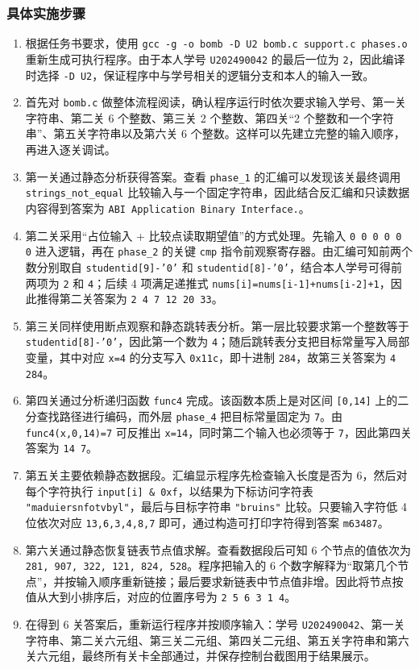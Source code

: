 \documentclass[supercite]{Experimental_Report}
\theoremstyle{definition}
\begin{document}
\subsubsection{具体实施步骤}
\begin{enumerate}
  \item 根据任务书要求，使用 \texttt{gcc -g -o bomb -D U2 bomb.c support.c phases.o} 重新生成可执行程序。由于本人学号 \texttt{U202490042} 的最后一位为 \texttt{2}，因此编译时选择 \texttt{-D U2}，保证程序中与学号相关的逻辑分支和本人的输入一致。
  \item 首先对 \texttt{bomb.c} 做整体流程阅读，确认程序运行时依次要求输入学号、第一关字符串、第二关 6 个整数、第三关 2 个整数、第四关“2 个整数和一个字符串”、第五关字符串以及第六关 6 个整数。这样可以先建立完整的输入顺序，再进入逐关调试。
  \item 第一关通过静态分析获得答案。查看 \texttt{phase\_1} 的汇编可以发现该关最终调用 \texttt{strings\_not\_equal} 比较输入与一个固定字符串，因此结合反汇编和只读数据内容得到答案为 \texttt{ABI Application Binary Interface.}。
  \item 第二关采用“占位输入 + 比较点读取期望值”的方式处理。先输入 \texttt{0 0 0 0 0 0} 进入逻辑，再在 \texttt{phase\_2} 的关键 \texttt{cmp} 指令前观察寄存器。由汇编可知前两个数分别取自 \texttt{studentid[9]-'0'} 和 \texttt{studentid[8]-'0'}，结合本人学号可得前两项为 \texttt{2} 和 \texttt{4}；后续 4 项满足递推式 \texttt{nums[i]=nums[i-1]+nums[i-2]+1}，因此推得第二关答案为 \texttt{2 4 7 12 20 33}。
  \item 第三关同样使用断点观察和静态跳转表分析。第一层比较要求第一个整数等于 \texttt{studentid[8]-'0'}，因此第一个数为 \texttt{4}；随后跳转表分支把目标常量写入局部变量，其中对应 \texttt{x=4} 的分支写入 \texttt{0x11c}，即十进制 \texttt{284}，故第三关答案为 \texttt{4 284}。
  \item 第四关通过分析递归函数 \texttt{func4} 完成。该函数本质上是对区间 \texttt{[0,14]} 上的二分查找路径进行编码，而外层 \texttt{phase\_4} 把目标常量固定为 \texttt{7}。由 \texttt{func4(x,0,14)=7} 可反推出 \texttt{x=14}，同时第二个输入也必须等于 \texttt{7}，因此第四关答案为 \texttt{14 7}。
  \item 第五关主要依赖静态数据段。汇编显示程序先检查输入长度是否为 6，然后对每个字符执行 \texttt{input[i] \& 0xf}，以结果为下标访问字符表 \texttt{"maduiersnfotvbyl"}，最后与目标字符串 \texttt{"bruins"} 比较。只要输入字符低 4 位依次对应 \texttt{13,6,3,4,8,7} 即可，通过构造可打印字符得到答案 \texttt{m63487}。
  \item 第六关通过静态恢复链表节点值求解。查看数据段后可知 6 个节点的值依次为 \texttt{281, 907, 322, 121, 824, 528}。程序把输入的 6 个数字解释为“取第几个节点”，并按输入顺序重新链接；最后要求新链表中节点值非增。因此将节点按值从大到小排序后，对应的位置序号为 \texttt{2 5 6 3 1 4}。
  \item 在得到 6 关答案后，重新运行程序并按顺序输入：学号 \texttt{U202490042}、第一关字符串、第二关六元组、第三关二元组、第四关二元组、第五关字符串和第六关六元组，最终所有关卡全部通过，并保存控制台截图用于结果展示。
\end{enumerate}
\end{document}
